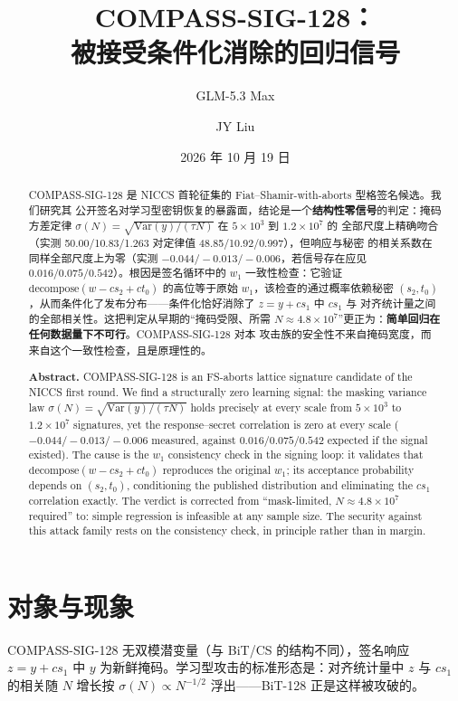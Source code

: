 \documentclass[UTF8,11pt,a4paper]{ctexart}
\title{\vspace{-1.2cm}\textbf{COMPASS-SIG-128：\\被接受条件化消除的回归信号}}
\author{GLM-5.3 Max \and JY Liu}
\date{2026 年 10 月 19 日}
\begin{document}
\maketitle
\thispagestyle{fancy}

\begin{abstract}\noindent
COMPASS-SIG-128 是 NICCS 首轮征集的 Fiat--Shamir-with-aborts 型格签名候选。我们研究其
公开签名对学习型密钥恢复的暴露面，结论是一个\textbf{结构性零信号}的判定：掩码方差定律
$\sigma(N) = \sqrt{\mathrm{Var}(y)/(\tau N)}$ 在 $5\times10^3$ 到 $1.2\times10^7$ 的
全部尺度上精确吻合（实测 50.00/10.83/1.263 对定律值 48.85/10.92/0.997），但响应与秘密
的相关系数在同样全部尺度上为零（实测 $-0.044/-0.013/-0.006$，若信号存在应见
$0.016/0.075/0.542$）。根因是签名循环中的 $w_1$ 一致性检查：它验证
$\mathrm{decompose}(w - c s_2 + c t_0)$ 的高位等于原始 $w_1$，该检查的通过概率依赖秘密
$(s_2, t_0)$，从而条件化了发布分布——条件化恰好消除了 $z = y + c s_1$ 中 $c s_1$ 与
对齐统计量之间的全部相关性。这把判定从早期的``掩码受限、所需 $N \approx
4.8\times10^7$''更正为：\textbf{简单回归在任何数据量下不可行}。COMPASS-SIG-128 对本
攻击族的安全性不来自掩码宽度，而来自这个一致性检查，且是原理性的。

\medskip\noindent\textbf{Abstract.}
COMPASS-SIG-128 is an FS-aborts lattice signature candidate of the NICCS first
round. We find a structurally zero learning signal: the masking variance law
$\sigma(N) = \sqrt{\mathrm{Var}(y)/(\tau N)}$ holds precisely at every scale
from $5\times10^3$ to $1.2\times10^7$ signatures, yet the response--secret
correlation is zero at every scale ($-0.044/-0.013/-0.006$ measured, against
$0.016/0.075/0.542$ expected if the signal existed). The cause is the $w_1$
consistency check in the signing loop: it validates that
$\mathrm{decompose}(w - cs_2 + ct_0)$ reproduces the original $w_1$; its
acceptance probability depends on $(s_2, t_0)$, conditioning the published
distribution and eliminating the $cs_1$ correlation exactly. The verdict is
corrected from ``mask-limited, $N \approx 4.8\times10^7$ required'' to: simple
regression is infeasible at any sample size. The security against this attack
family rests on the consistency check, in principle rather than in margin.
\end{abstract}

\section{对象与现象}

COMPASS-SIG-128 无双模潜变量（与 BiT/CS 的结构不同），签名响应 $z = y + c s_1$ 中
$y$ 为新鲜掩码。学习型攻击的标准形态是：对齐统计量中 $z$ 与 $c s_1$ 的相关随 $N$
增长按 $\sigma(N) \propto N^{-1/2}$ 浮出——BiT-128 正是这样被攻破的。
\end{document}
